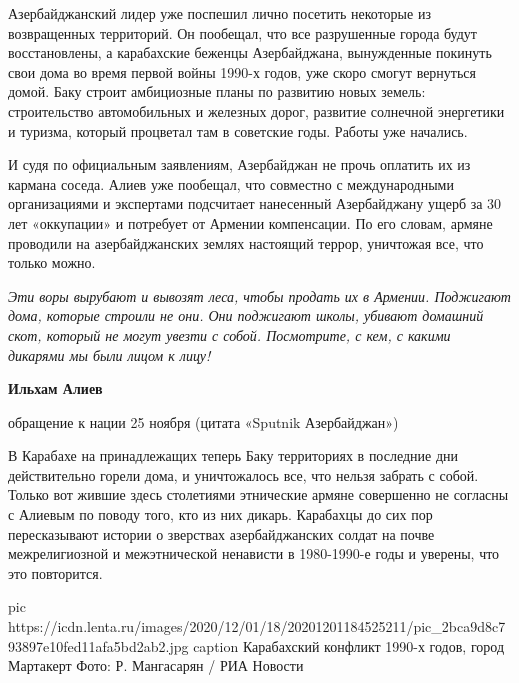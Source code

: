 Азербайджанский лидер уже поспешил лично посетить некоторые из возвращенных
территорий. Он пообещал, что все разрушенные города будут восстановлены, а
карабахские беженцы Азербайджана, вынужденные покинуть свои дома во время
первой войны 1990-х годов, уже скоро смогут вернуться домой. Баку строит
амбициозные планы по развитию новых земель: строительство автомобильных и
железных дорог, развитие солнечной энергетики и туризма, который процветал там
в советские годы. Работы уже начались.

И судя по официальным заявлениям, Азербайджан не прочь оплатить их из кармана
соседа. Алиев уже пообещал, что совместно с международными организациями и
экспертами подсчитает нанесенный Азербайджану ущерб за 30 лет «оккупации» и
потребует от Армении компенсации. По его словам, армяне проводили на
азербайджанских землях настоящий террор, уничтожая все, что только можно.

\begin{leftbar}
\emph{Эти воры вырубают и вывозят леса, чтобы продать их в Армении. Поджигают дома,
которые строили не они. Они поджигают школы, убивают домашний скот,
который не могут увезти с собой. Посмотрите, с кем, с какими дикарями
мы были лицом к лицу!}\par
\textbf{Ильхам Алиев}\par
обращение к нации 25 ноября (цитата «Sputnik Азербайджан»)	
\end{leftbar}

В Карабахе на принадлежащих теперь Баку территориях в последние дни
действительно горели дома, и уничтожалось все, что нельзя забрать с собой.
Только вот жившие здесь столетиями этнические армяне совершенно не согласны с
Алиевым по поводу того, кто из них дикарь. Карабахцы до сих пор пересказывают
истории о зверствах азербайджанских солдат на почве межрелигиозной и
межэтнической ненависти в 1980-1990-е годы и уверены, что это повторится.

\ifcmt
pic https://icdn.lenta.ru/images/2020/12/01/18/20201201184525211/pic_2bca9d8c793897e10fed11afa5bd2ab2.jpg
caption Карабахский конфликт 1990-х годов, город Мартакерт Фото: Р. Мангасарян / РИА Новости
\fi
